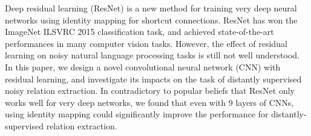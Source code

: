 Deep residual learning (ResNet) is a new method for training very deep neural networks using identity mapping for shortcut connections. ResNet has won the ImageNet ILSVRC 2015 classification task, and achieved state-of-the-art performances in many computer vision tasks. However, the effect of residual learning on noisy natural language processing tasks is still not well understood. In this paper, we design a novel convolutional neural network (CNN) with residual learning, and investigate its impacts on the task of distantly supervised noisy relation extraction.  In contradictory to popular beliefs that ResNet only works well for very deep networks, we found  that even with 9 layers of CNNs, using identity mapping could significantly improve the performance for distantly-supervised relation extraction.

